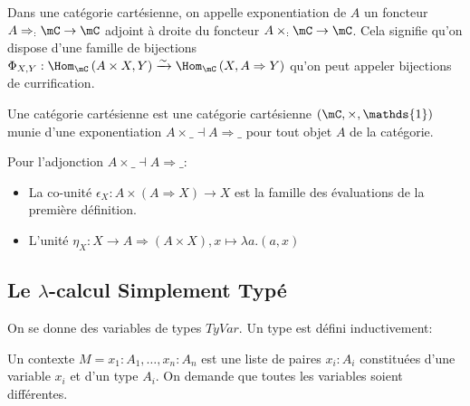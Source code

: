 \documentclass[math, info]{cours}
\begin{document}
\begin{definition}
	Dans une catégorie cartésienne, on appelle exponentiation de $A$ un foncteur $A \Rightarrow _: \mC \to \mC$ adjoint à droite du foncteur $A \times _: \mC \to \mC$.
	Cela signifie qu'on dispose d'une famille de bijections $\Phi_{X, Y}: \Hom_{\mC}\left( A\times X, Y \right) \xrightarrow{\sim}\Hom_{\mC}\left( X, A \Rightarrow Y \right)$
	qu'on peut appeler bijections de currification.
\end{definition}

\begin{definition}
	Une catégorie cartésienne est une catégorie cartésienne $\left( \mC, \times, \mathds{1} \right)$ munie d'une exponentiation $A \times \_ \dashv A \Rightarrow \_$ pour tout objet $A$ de la catégorie.
\end{definition}

\begin{remarque}
	Pour l'adjonction $A \times \_ \dashv A \Rightarrow \_$:
	\begin{itemize}
		\item La co-unité $\epsilon_{X}: A \times \left( A\Rightarrow X \right) \to X$ est la famille des évaluations de la première définition.
		\item L'unité $\eta_{X}: X \to A \Rightarrow \left( A \times X \right), x \mapsto \lambda a. (a, x)$
	\end{itemize}
\end{remarque}
\subsection[Le Lambda-Calcul Simplement Typé]{Le $\lambda$-calcul Simplement Typé}
\begin{definition}
On se donne des variables de types $TyVar$. Un type est défini inductivement:
\begin{center}
\begin{mgrammar}
\end{mgrammar}
\end{center}
Un contexte $M = x_{1}: A_{1}, \ldots, x_{n}: A_{n}$ est une liste de paires $x_{i}: A_{i}$ constituées d'une variable $x_{i}$ et d'un type $A_{i}$.
On demande que toutes les variables soient différentes.
\end{definition}
\end{document}

